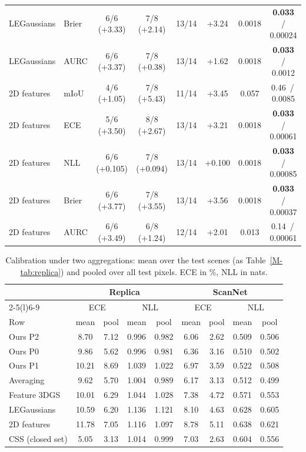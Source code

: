 \documentclass[journal]{IEEEtran}
\begin{document}
\begin{table}[t]
\begin{tabular}{@{}llcccccc@{}}
LEGaussians & Brier & 6/6 (+3.33) & 7/8 (+2.14) & 13/14 & +3.24 & 0.0018 & \textbf{0.033} \,/\, 0.00024\\
LEGaussians & AURC & 6/6 (+3.37) & 7/8 (+0.38) & 13/14 & +1.62 & 0.0018 & \textbf{0.033} \,/\, 0.0012\\
\midrule
2D features & mIoU & 4/6 (+1.05) & 7/8 (+5.43) & 11/14 & +3.45 & 0.057 & 0.46 \,/\, 0.0085\\
2D features & ECE & 5/6 (+3.50) & 8/8 (+2.67) & 13/14 & +3.21 & 0.0018 & \textbf{0.033} \,/\, 0.00061\\
2D features & NLL & 6/6 (+0.105) & 7/8 (+0.094) & 13/14 & +0.100 & 0.0018 & \textbf{0.033} \,/\, 0.00085\\
2D features & Brier & 6/6 (+3.77) & 7/8 (+3.55) & 13/14 & +3.56 & 0.0018 & \textbf{0.033} \,/\, 0.00037\\
2D features & AURC & 6/6 (+3.49) & 6/8 (+1.24) & 12/14 & +2.01 & 0.013 & 0.14 \,/\, 0.00061\\
\bottomrule
\end{tabular}
\end{table}

\begin{table}[t]
\centering
\caption{Calibration under two aggregations: mean over the test scenes (as Table~\ref{M-tab:replica}) and pooled over all test pixels. ECE in \%, NLL in nats.}
\label{tab:calib}
\footnotesize
\setlength{\tabcolsep}{2.5pt}
\begin{tabular}{@{}lcccccccc@{}}
\toprule
& \multicolumn{4}{c}{Replica} & \multicolumn{4}{c}{ScanNet}\\
\cmidrule(lr){2-5}\cmidrule(l){6-9}
& \multicolumn{2}{c}{ECE} & \multicolumn{2}{c}{NLL} & \multicolumn{2}{c}{ECE} & \multicolumn{2}{c}{NLL}\\
Row & mean & pool & mean & pool & mean & pool & mean & pool\\
\midrule
Ours P2 & 8.70 & 7.12 & 0.996 & 0.982 & 6.06 & 2.62 & 0.509 & 0.506\\
Ours P0 & 9.86 & 5.62 & 0.996 & 0.981 & 6.36 & 3.16 & 0.510 & 0.502\\
Ours P1 & 10.21 & 8.69 & 1.039 & 1.022 & 6.97 & 3.59 & 0.522 & 0.508\\
Averaging & 9.62 & 5.70 & 1.004 & 0.989 & 6.17 & 3.13 & 0.512 & 0.499\\
Feature 3DGS & 10.01 & 6.29 & 1.044 & 1.028 & 7.38 & 4.72 & 0.571 & 0.553\\
LEGaussians & 10.59 & 6.20 & 1.136 & 1.121 & 8.10 & 4.63 & 0.628 & 0.605\\
2D features & 11.78 & 7.05 & 1.116 & 1.097 & 8.78 & 5.11 & 0.638 & 0.621\\
CSS (closed set) & 5.05 & 3.13 & 1.014 & 0.999 & 7.03 & 2.63 & 0.604 & 0.556\\
\bottomrule
\end{tabular}
\end{table}
\end{document}

